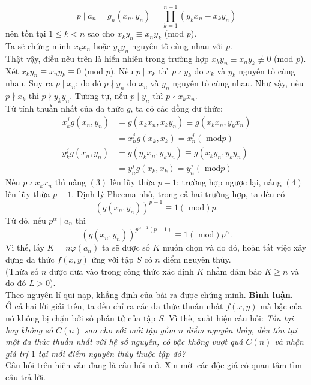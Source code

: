 \begin{bt}
{		$$ p \mid a_n=g_n(x_n,y_n) = \prod_{k=1}^{n-1}(y_kx_n-x_ky_n) $$
		nên tồn tại $1 \le k < n$ sao cho $x_ky_n \equiv x_ny_k$ (mod $p$).\\
		Ta sẽ chứng minh $x_kx_n$ hoặc $y_ky_n$ nguyên tố cùng nhau với $p$.\\
		Thật vậy, điều nêu trên là hiển nhiên trong trường hợp $x_ky_n \equiv x_ny_k 	\not\equiv 0$ (mod $p$).\\
		Xét $x_ky_n \equiv x_ny_k \equiv 0$  (mod $p$). Nếu $p \mid x_k$ thì $p \nmid y_k$ do $x_k$ và $y_k$ nguyên tố cùng nhau. Suy ra $p \mid x_n$; do đó $p \nmid y_n$ do $x_n$ và $y_n$ nguyên tố cùng nhau. Như vậy, nếu $p \nmid x_k$ thì $p \nmid y_ky_n$. Tương tự, nếu $p \mid y_n$ thì $p \nmid x_kx_n$.\\
		Từ tính thuần nhất của đa thức $g$, ta có các đồng dư thức:
		{\allowdisplaybreaks
		\begin{align*}
		x_k^jg(x_n,y_n)& = g(x_kx_n,x_ky_n) \equiv g(x_kx_n,y_kx_n)\\ 
		& = x_n^jg(x_k,x_k) = x_n^j (\text{ mod} p)\tag{3}\\
		y_k^jg(x_n,y_n)& = g(y_kx_n,y_ky_n) \equiv g(x_ky_n,y_ky_n)\\ 
		& = y_n^jg(x_k,x_k) = y_n^j (\text{ mod} p)\tag{4}
		\end{align*}}Nếu $p \nmid x_kx_n$ thì nâng $(3)$ lên lũy thừa $p-1$; trường hợp ngược lại, nâng $(4)$ lên lũy thừa $p-1$. Định lý Phecma nhỏ, trong cả hai trường hợp, ta đều có
		$$ (g(x_n,y_n))^{p-1} \equiv 1 (\text{ mod}) p .$$
		Từ đó, nếu $p^\alpha \mid a_n$ thì 
		$$ (g(x_n,y_n))^{p^{\alpha -1}(p-1)} \equiv 1 (\text{ mod})p^\alpha. $$
		Vì thế, lấy $K = n \varphi(a_n) $ ta sẽ được số $K$ muốn chọn và do đó, hoàn tất việc xây dựng đa thức $f(x,y)$ ứng với tập $S$ có $n$ điểm nguyên thủy.\\
		(Thừa số $n$ được đưa vào trong công thức xác định $K$ nhằm đảm bảo $K \ge n$ và do đó $L > 0$).\\
		Theo nguyên lí qui nạp, khẳng định của bài ra được chứng minh.
{\bf Bình luận.}\\
Ở cả hai lời giải trên, ta đều chỉ ra các đa thức thuần nhất $f(x,y)$ mà bậc của nó không bị chặn bởi số phần tử của tập $S$. Vì thế, xuất hiện câu hỏi: {\it Tồn tại hay không số $C(n)$ sao cho với mỗi tập gồm $n$ điểm nguyên thủy, đều tồn tại một đa thức thuần nhất với hệ số nguyên, có bậc không vượt quá $C(n)$ và nhận giá trị $1$ tại mỗi điểm nguyên thủy thuộc tập đó?}\\
Câu hỏi trên hiện vẫn đang là câu hỏi mở. Xin mời các độc giả có quan tâm tìm câu trả lời.
	} 
\end{bt}

